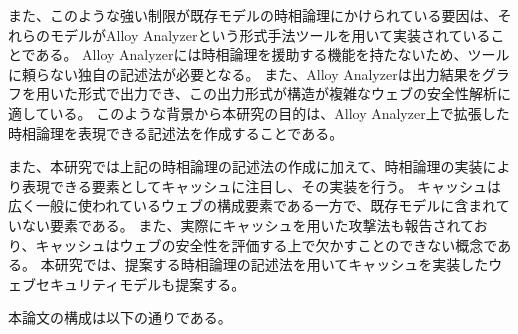 \documentclass[12pt,a4paper]{jbook}
\begin{document}
また、このような強い制限が既存モデルの時相論理にかけられている要因は、それらのモデルがAlloy Analyzerという形式手法ツールを用いて実装されていることである。
Alloy Analyzerには時相論理を援助する機能を持たないため、ツールに頼らない独自の記述法が必要となる。
また、Alloy Analyzerは出力結果をグラフを用いた形式で出力でき、この出力形式が構造が複雑なウェブの安全性解析に適している。
このような背景から本研究の目的は、Alloy Analyzer上で拡張した時相論理を表現できる記述法を作成することである。

また、本研究では上記の時相論理の記述法の作成に加えて、時相論理の実装により表現できる要素としてキャッシュに注目し、その実装を行う。
キャッシュは広く一般に使われているウェブの構成要素である一方で、既存モデルに含まれていない要素である。
また、実際にキャッシュを用いた攻撃法\cite{bcpattack}も報告されており、キャッシュはウェブの安全性を評価する上で欠かすことのできない概念である。
本研究では、提案する時相論理の記述法を用いてキャッシュを実装したウェブセキュリティモデルも提案する。

本論文の構成は以下の通りである。
\end{document}
